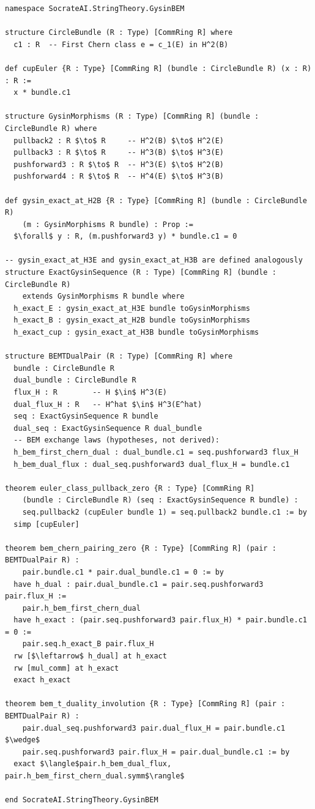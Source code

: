 \documentclass[11pt,a4paper]{article}
\begin{document}
\begin{lstlisting}[language=lean, caption={Excerpt of \texttt{proofs/GysinBEMSequence.lean} (docstrings abridged; Unicode replaced by math-mode symbols for typesetting)}, label={lst:bem_duality}]
namespace SocrateAI.StringTheory.GysinBEM

structure CircleBundle (R : Type) [CommRing R] where
  c1 : R  -- First Chern class e = c_1(E) in H^2(B)

def cupEuler {R : Type} [CommRing R] (bundle : CircleBundle R) (x : R) : R :=
  x * bundle.c1

structure GysinMorphisms (R : Type) [CommRing R] (bundle : CircleBundle R) where
  pullback2 : R $\to$ R     -- H^2(B) $\to$ H^2(E)
  pullback3 : R $\to$ R     -- H^3(B) $\to$ H^3(E)
  pushforward3 : R $\to$ R  -- H^3(E) $\to$ H^2(B)
  pushforward4 : R $\to$ R  -- H^4(E) $\to$ H^3(B)

def gysin_exact_at_H2B {R : Type} [CommRing R] (bundle : CircleBundle R)
    (m : GysinMorphisms R bundle) : Prop :=
  $\forall$ y : R, (m.pushforward3 y) * bundle.c1 = 0

-- gysin_exact_at_H3E and gysin_exact_at_H3B are defined analogously
structure ExactGysinSequence (R : Type) [CommRing R] (bundle : CircleBundle R)
    extends GysinMorphisms R bundle where
  h_exact_E : gysin_exact_at_H3E bundle toGysinMorphisms
  h_exact_B : gysin_exact_at_H2B bundle toGysinMorphisms
  h_exact_cup : gysin_exact_at_H3B bundle toGysinMorphisms

structure BEMTDualPair (R : Type) [CommRing R] where
  bundle : CircleBundle R
  dual_bundle : CircleBundle R
  flux_H : R        -- H $\in$ H^3(E)
  dual_flux_H : R   -- H^hat $\in$ H^3(E^hat)
  seq : ExactGysinSequence R bundle
  dual_seq : ExactGysinSequence R dual_bundle
  -- BEM exchange laws (hypotheses, not derived):
  h_bem_first_chern_dual : dual_bundle.c1 = seq.pushforward3 flux_H
  h_bem_dual_flux : dual_seq.pushforward3 dual_flux_H = bundle.c1

theorem euler_class_pullback_zero {R : Type} [CommRing R]
    (bundle : CircleBundle R) (seq : ExactGysinSequence R bundle) :
    seq.pullback2 (cupEuler bundle 1) = seq.pullback2 bundle.c1 := by
  simp [cupEuler]

theorem bem_chern_pairing_zero {R : Type} [CommRing R] (pair : BEMTDualPair R) :
    pair.bundle.c1 * pair.dual_bundle.c1 = 0 := by
  have h_dual : pair.dual_bundle.c1 = pair.seq.pushforward3 pair.flux_H :=
    pair.h_bem_first_chern_dual
  have h_exact : (pair.seq.pushforward3 pair.flux_H) * pair.bundle.c1 = 0 :=
    pair.seq.h_exact_B pair.flux_H
  rw [$\leftarrow$ h_dual] at h_exact
  rw [mul_comm] at h_exact
  exact h_exact

theorem bem_t_duality_involution {R : Type} [CommRing R] (pair : BEMTDualPair R) :
    pair.dual_seq.pushforward3 pair.dual_flux_H = pair.bundle.c1 $\wedge$
    pair.seq.pushforward3 pair.flux_H = pair.dual_bundle.c1 := by
  exact $\langle$pair.h_bem_dual_flux, pair.h_bem_first_chern_dual.symm$\rangle$

end SocrateAI.StringTheory.GysinBEM
\end{lstlisting}
\end{document}
